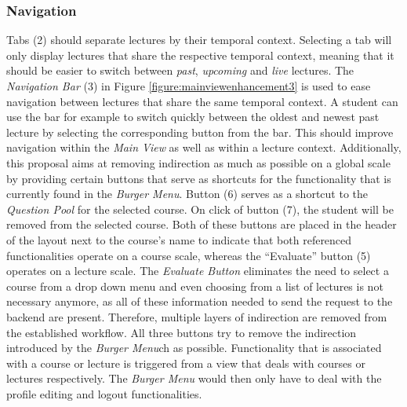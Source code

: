 \subsubsection{Navigation}
\label{section:con:proposals:mainview:navigation}
Tabs (2) should separate lectures by their temporal context. Selecting a tab will only display lectures that share the respective temporal context, meaning that it should be easier to switch between \emph{past}, \emph{upcoming} and \emph{live} lectures.
The \emph{Navigation Bar} (3) in Figure \ref{figure:mainviewenhancement3} is used to ease navigation between lectures that share the same temporal context. A student can use the bar for example to switch quickly between the oldest and newest past lecture by selecting the corresponding button from the bar. This should improve navigation within the \emph{Main View} as well as within a lecture context. 
Additionally, this proposal aims at removing indirection as much as possible on a global scale by providing certain buttons that serve as shortcuts for the functionality that is currently found in the \emph{Burger Menu}. Button (6) serves as a shortcut to the \emph{Question Pool} for the selected course. On click of button (7), the student will be removed from the selected course. Both of these buttons are placed in the header of the layout next to the course’s name to indicate that both referenced functionalities operate on a course scale, whereas the “Evaluate” button (5) operates on a lecture scale. The \emph{Evaluate Button} eliminates the need to select a course from a drop down menu and even choosing from a list of lectures is not necessary anymore, as all of these information needed to send the request to the backend are present. Therefore, multiple layers of indirection are removed from the established workflow. All three buttons try to remove the indirection introduced by the \emph{Burger Menu}ch as possible. Functionality that is associated with a course or lecture is triggered from a view that deals with courses or lectures respectively. The \emph{Burger Menu} would then only have to deal with the profile editing and  logout functionalities.

